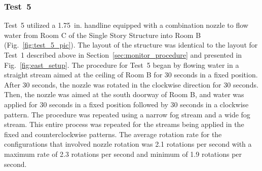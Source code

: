 \documentclass[12pt,oneside]{book}
\begin{document}
\subsubsection{Test~5}
Test~5 utilized a 1.75~in. handline equipped with a combination nozzle to flow water from Room C of the Single Story Structure into Room B (Fig.~\ref{fig:test_5_pic}). The layout of the structure was identical to the layout for Test~1 described above in Section~\ref{sec:monitor_procedure} and presented in Fig.~\ref{fig:east_setup}. The procedure for Test~5 began by flowing water in a straight stream aimed at the ceiling of Room B for 30 seconds in a fixed position. After 30 seconds, the nozzle was rotated in the clockwise direction for 30 seconds. Then, the nozzle was aimed at the south doorway of Room B, and water was applied for 30 seconds in a fixed position followed by 30 seconds in a clockwise pattern. The procedure was repeated using a narrow fog stream and a wide fog stream. This entire process was repeated for the streams being applied in the fixed and counterclockwise patterns. The average rotation rate for the configurations that involved nozzle rotation was 2.1 rotations per second with a maximum rate of 2.3 rotations per second and minimum of 1.9 rotations per second. 
\end{document}
